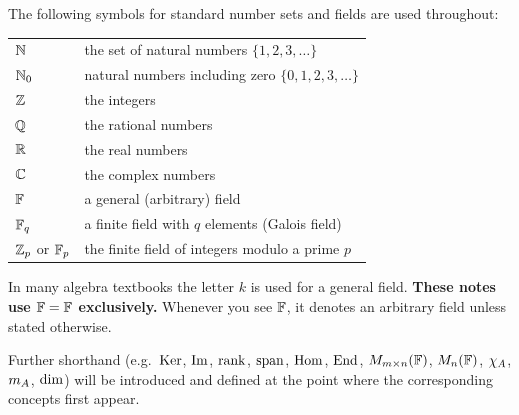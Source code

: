 \begin{defbox}
The following symbols for standard number sets and fields are used throughout:
\begin{center}
\renewcommand{\arraystretch}{1.25}
\begin{tabular}{ll}
    $\mathbb{N}$                   & the set of natural numbers $\{1,2,3,\ldots\}$ \\
    $\mathbb{N}_0$                 & natural numbers including zero $\{0,1,2,3,\ldots\}$ \\
    $\mathbb{Z}$                   & the integers \\
    $\mathbb{Q}$                   & the rational numbers \\
    $\mathbb{R}$                   & the real numbers \\
    $\mathbb{C}$                   & the complex numbers \\
    $\mathbb{F}$                   & a general (arbitrary) field \\
    $\mathbb{F}_q$                 & a finite field with $q$ elements (Galois field) \\
    $\mathbb{Z}_p$ or $\mathbb{F}_p$       & the finite field of integers modulo a prime $p$ \\
\end{tabular}
\end{center}
\end{defbox}

\begin{warnbox}
In many algebra textbooks the letter $k$ is used for a general field.
\textbf{These notes use $\mathbb{F} = \mathbb{F}$ exclusively.}
Whenever you see $\mathbb{F}$, it denotes an arbitrary field unless stated otherwise.
\end{warnbox}

\begin{tipbox}
Further shorthand (e.g.\ $\operatorname{Ker}$, $\operatorname{Im}$, $\operatorname{rank}$, $\operatorname{span}$, $\operatorname{Hom}$, $\operatorname{End}$,
$M_{m\times n}(\mathbb{F})$, $M_{n}(\mathbb{F})$, $\chi_A$, $m_A$, $\operatorname{dim}$) will be introduced and
defined at the point where the corresponding concepts first appear.
\end{tipbox}
